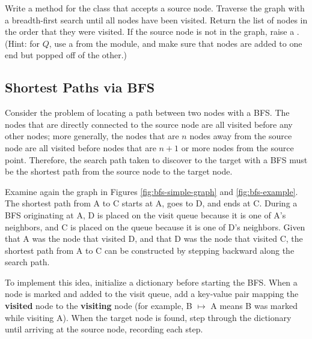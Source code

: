 \begin{problem} %
\label{prob:bfs-traversal}
Write a method for the  class that accepts a source node.
Traverse the graph with a breadth-first search until all nodes have been visited.
Return the list of nodes in the order that they were visited.
If the source node is not in the graph, raise a .
\\(Hint: for $Q$, use a  from the  module, and make sure that nodes are added to one end but popped off of the other.)
\end{problem}

\subsection*{Shortest Paths via BFS} %

Consider the problem of locating a path between two nodes with a BFS.
The nodes that are directly connected to the source node are all visited before any other nodes; more generally, the nodes that are $n$ nodes away from the source node are all visited before nodes that are $n+1$ or more nodes from the source point.
Therefore, the search path taken to discover to the target with a BFS must be the shortest path from the source node to the target node.

Examine again the graph in Figures \ref{fig:bfs-simple-graph} and \ref{fig:bfs-example}.
The shortest path from A to C starts at A, goes to D, and ends at C.
During a BFS originating at A, D is placed on the visit queue because it is one of A's neighbors, and C is placed on the queue because it is one of D's neighbors.
Given that A was the node that visited D, and that D was the node that visited C, the shortest path from A to C can be constructed by stepping backward along the search path.

To implement this idea, initialize a dictionary before starting the BFS.
When a node is marked and added to the visit queue, add a key-value pair mapping the \textbf{visited} node to the \textbf{visiting} node (for example, B $\mapsto$ A means B was marked while visiting A).
When the target node is found, step through the dictionary until arriving at the source node, recording each step.

